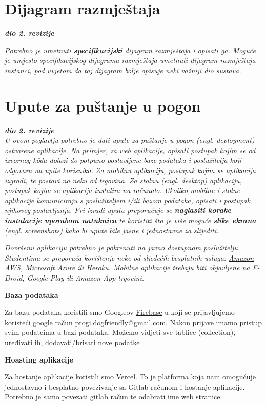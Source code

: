 			
			\eject 
		
		
		\section{Dijagram razmještaja}
			
			\textbf{\textit{dio 2. revizije}}
			
			 \textit{Potrebno je umetnuti \textbf{specifikacijski} dijagram razmještaja i opisati ga. Moguće je umjesto specifikacijskog dijagrama razmještaja umetnuti dijagram razmještaja instanci, pod uvjetom da taj dijagram bolje opisuje neki važniji dio sustava.}
			
			\eject 
		
		\section{Upute za puštanje u pogon}
		
			\textbf{\textit{dio 2. revizije}}\\
		
			 \textit{U ovom poglavlju potrebno je dati upute za puštanje u pogon (engl. deployment) ostvarene aplikacije. Na primjer, za web aplikacije, opisati postupak kojim se od izvornog kôda dolazi do potpuno postavljene baze podataka i poslužitelja koji odgovara na upite korisnika. Za mobilnu aplikaciju, postupak kojim se aplikacija izgradi, te postavi na neku od trgovina. Za stolnu (engl. desktop) aplikaciju, postupak kojim se aplikacija instalira na računalo. Ukoliko mobilne i stolne aplikacije komuniciraju s poslužiteljem i/ili bazom podataka, opisati i postupak njihovog postavljanja. Pri izradi uputa preporučuje se \textbf{naglasiti korake instalacije uporabom natuknica} te koristiti što je više moguće \textbf{slike ekrana} (engl. screenshots) kako bi upute bile jasne i jednostavne za slijediti.}
			
			
			 \textit{Dovršenu aplikaciju potrebno je pokrenuti na javno dostupnom poslužitelju. Studentima se preporuča korištenje neke od sljedećih besplatnih usluga: \href{https://aws.amazon.com/}{Amazon AWS}, \href{https://azure.microsoft.com/en-us/}{Microsoft Azure} ili \href{https://www.heroku.com/}{Heroku}. Mobilne aplikacije trebaju biti objavljene na F-Droid, Google Play ili Amazon App trgovini.}

   \textbf{Baza podataka}

    Za bazu podataka koristili smo Googleov \href{https://firebase.google.com/}{Firebase} u koji se prijavljujemo koristeći google račun progi.dogfriendly@gmail.com. Nakon prijave imamo pristup svim podatcima u bazi podataka. Možemo vidjeti sve tablice (collection), uređivati ih, dodavati/brisati nove podatke

    \textbf{Hoasting aplikacije}
    
    Za hostanje aplikacije koristili smo \href{https://vercel.com/}{Vercel}. To je platforma koja nam omogućuje jednostavno i besplatno povezivanje sa Gitlab računom i hostanje aplikacije. Potrebno je samo povezati gitlab račun te odabrati ime web stranice. 
			
			
			\eject 